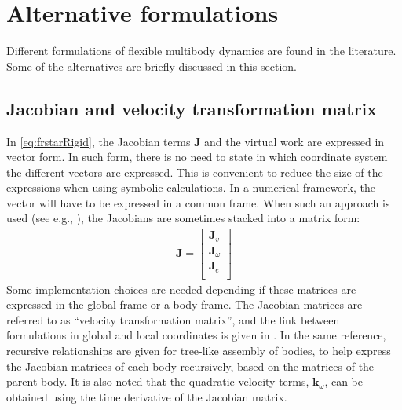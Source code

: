 \documentclass[wes, manuscript]{copernicus}
\renewcommand{\v}[1]{\boldsymbol{#1}}
\newcommand{\m}[1]{\boldsymbol{#1}}
\begin{document}
\section{Alternative formulations}
\label{sec:AlternativeFormulations}

Different formulations of flexible multibody dynamics are found in the literature.
Some of the alternatives are briefly discussed in this section.


\subsection{Jacobian and velocity transformation matrix}
In \autoref{eq:frstarRigid}, the Jacobian terms $\v{J}$ and the virtual work are expressed in vector form.
In such form, there is no need to state in which coordinate system the different vectors are expressed.
This is convenient to reduce the size of the expressions when using symbolic calculations.
In a numerical framework, the vector will have to be expressed in a common frame.
When such an approach is used (see e.g., \cite{Lemmer:2018, branlard:2019flex}), the Jacobians are sometimes stacked into a matrix form:
\begin{align}
\m{J} = 
    \begin{bmatrix}
    \v{J}_v \\
    \v{J}_\omega\\
    \v{J}_e \\
    \end{bmatrix}
\end{align}
Some implementation choices are needed depending if these matrices are expressed in the global frame or a body frame.
    The Jacobian matrices are referred to as ``velocity transformation matrix'', and the link between formulations in global and local coordinates is given in \cite{branlard:2019flex}.
    In the same reference, recursive relationships are given for tree-like assembly of bodies, to help express the Jacobian matrices of each body recursively, based on the matrices of the parent body.
    It is also noted that the quadratic velocity terms, $\v{k}_\omega$, can be obtained using the time derivative of the Jacobian matrix.
\end{document}

